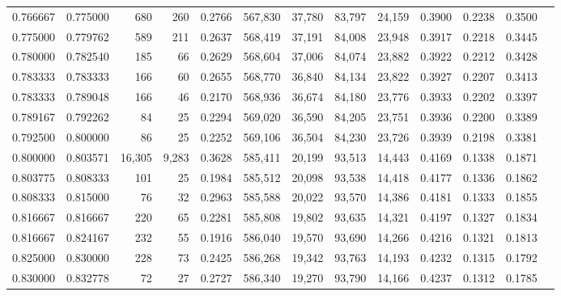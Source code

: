\begin{tabular}{rrrrrrrrrrrrr}
0.766667 & 0.775000 &    680 &    260 &                                     0.2766 & 567,830 &  37,780 &  83,797 &  24,159 & 0.3900 & 0.2238 & 0.3500 \\
0.775000 & 0.779762 &    589 &    211 &                                     0.2637 & 568,419 &  37,191 &  84,008 &  23,948 & 0.3917 & 0.2218 & 0.3445 \\
0.780000 & 0.782540 &    185 &     66 &                                     0.2629 & 568,604 &  37,006 &  84,074 &  23,882 & 0.3922 & 0.2212 & 0.3428 \\
0.783333 & 0.783333 &    166 &     60 &                                     0.2655 & 568,770 &  36,840 &  84,134 &  23,822 & 0.3927 & 0.2207 & 0.3413 \\
0.783333 & 0.789048 &    166 &     46 &                                     0.2170 & 568,936 &  36,674 &  84,180 &  23,776 & 0.3933 & 0.2202 & 0.3397 \\
0.789167 & 0.792262 &     84 &     25 &                                     0.2294 & 569,020 &  36,590 &  84,205 &  23,751 & 0.3936 & 0.2200 & 0.3389 \\
0.792500 & 0.800000 &     86 &     25 &                                     0.2252 & 569,106 &  36,504 &  84,230 &  23,726 & 0.3939 & 0.2198 & 0.3381 \\
0.800000 & 0.803571 & 16,305 &  9,283 &                                     0.3628 & 585,411 &  20,199 &  93,513 &  14,443 & 0.4169 & 0.1338 & 0.1871 \\
0.803775 & 0.808333 &    101 &     25 &                                     0.1984 & 585,512 &  20,098 &  93,538 &  14,418 & 0.4177 & 0.1336 & 0.1862 \\
0.808333 & 0.815000 &     76 &     32 &                                     0.2963 & 585,588 &  20,022 &  93,570 &  14,386 & 0.4181 & 0.1333 & 0.1855 \\
0.816667 & 0.816667 &    220 &     65 &                                     0.2281 & 585,808 &  19,802 &  93,635 &  14,321 & 0.4197 & 0.1327 & 0.1834 \\
0.816667 & 0.824167 &    232 &     55 &                                     0.1916 & 586,040 &  19,570 &  93,690 &  14,266 & 0.4216 & 0.1321 & 0.1813 \\
0.825000 & 0.830000 &    228 &     73 &                                     0.2425 & 586,268 &  19,342 &  93,763 &  14,193 & 0.4232 & 0.1315 & 0.1792 \\
0.830000 & 0.832778 &     72 &     27 &                                     0.2727 & 586,340 &  19,270 &  93,790 &  14,166 & 0.4237 & 0.1312 & 0.1785 \\

\end{tabular}
